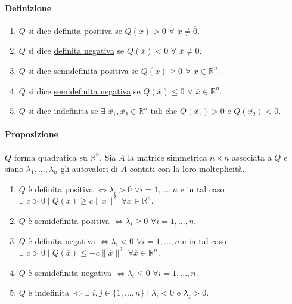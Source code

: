 \documentclass{article}
\newcommand{\R}{\mathbb{R}}
\begin{document}
\paragraph{{Definizione}}
\begin{enumerate}
    \item $Q$ si dice \underline{definita positiva} se $Q(\overline{x}) >0\,\, \forall\,\, \overline{x} \neq \overline{0}$.
    \item $Q$ si dice \underline{definita negativa} se $Q(\overline{x})<0 \,\, \forall \,\, \overline{x} \neq \overline{0}$.
    \item $Q$ si dice \underline{semidefinita positiva} se $Q(\overline{x})\geq 0 \,\, \forall \,\, \overline{x} \in \R^n$.
    \item $Q$ si dice \underline{semidefinita negativa} se $Q(\overline{x})\leq 0 \,\, \forall \,\, \overline{x} \in \R^n$.
    \item $Q$ si dice \underline{indefinita} se $\exists \,\,\overline{x_1},\overline{x_2}\in \R^{n}$ tali che $Q(\overline{x_1})>0$ e $Q(\overline{x_2})<0$.
\end{enumerate}

\paragraph{{Proposizione}}
$Q$ forma quadratica su $\R^n$. Sia $A$ la matrice simmetrica $n \times n$ associata a $Q$ e siano $\lambda_1,...,\lambda_n$ gli autovalori di $A$ contati con la loro molteplicità.
\begin{enumerate}
    \item $Q$ è definita positiva $\Leftrightarrow \lambda_i >0 \,\, \forall i =1,...,n$ e in tal caso $\exists \,\, c >0 \mid Q(\overline{x})\geq c\|\overline{x}\|^2\,\, \forall \overline{x} \in \R^n$.
    \item $Q$ è semidefinita positiva $\Leftrightarrow \lambda_i \geq 0 \,\, \forall i=1,...,n$.
    \item $Q$ è definita negativa $\Leftrightarrow \lambda_i <0 \,\, \forall i =1,...,n$ e in tal caso $\exists \,\, c >0 \mid Q(\overline{x})\leq -c\|\overline{x}\|^2\,\, \forall \overline{x} \in \R^n$.
    \item $Q$ è semidefinita negativa $\Leftrightarrow \lambda_i \leq 0 \,\, \forall i=1,...,n$.
    \item $Q$ è indefinita $\Leftrightarrow \exists\,\, i,j \in \{1,...,n\} \mid \lambda_i <0$ e $\lambda_j>0$.
\end{enumerate}
\end{document}

